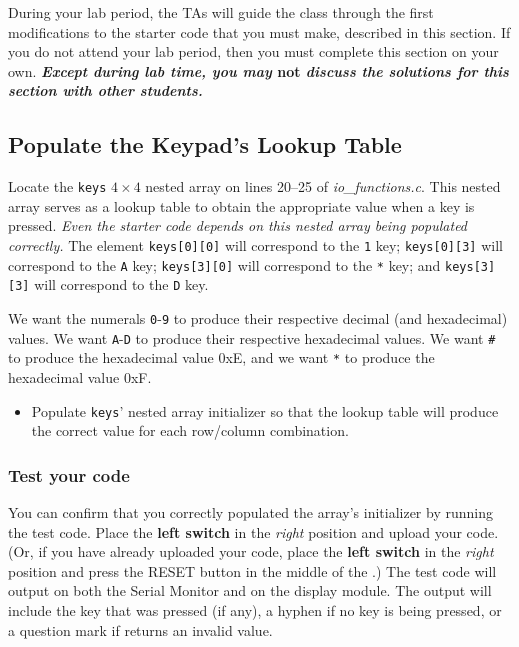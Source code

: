 During your lab period, the TAs will guide the class through the first modifications to the starter code that you must make, described in this section.
If you do not attend your lab period, then you must complete this section on your own.
\textbf{\textit{Except during lab time, you may }not\textit{ discuss the solutions for this section with other students.}}




\subsection{Populate the Keypad's Lookup Table} \label{subsec:populatekeypad}

Locate the \lstinline{keys} $4 \times 4$ nested array on lines 20--25 of \textit{io\_functions.c}.
This nested array serves as a lookup table to obtain the appropriate value when a key is pressed.
\textit{Even the starter code depends on this nested array being populated correctly.}
The element \lstinline{keys[0][0]} will correspond to the \texttt{1} key;
\lstinline{keys[0][3]} will correspond to the \texttt{A} key;
\lstinline{keys[3][0]} will correspond to the \texttt{*} key;
and \lstinline{keys[3][3]} will correspond to the \texttt{D} key.

We want the numerals \texttt{0}-\texttt{9} to produce their respective decimal (and hexadecimal) values.
We want \texttt{A}-\texttt{D} to produce their respective hexadecimal values.
We want \texttt{\#} to produce the hexadecimal value 0xE, and we want \texttt{*} to produce the hexadecimal value 0xF\@.

\begin{itemize}
    \item Populate \lstinline{keys}' nested array initializer so that the lookup table will produce the correct value for each row/column combination.
\end{itemize}

\subsubsection*{Test your code}

You can confirm that you correctly populated the array's initializer by running the test code.
Place the \textbf{left switch} in the \textit{right} position and upload your code.
(Or, if you have already uploaded your code, place the \textbf{left switch} in the \textit{right} position and press the RESET button in the middle of the \developmentboard.)
The test code will output on both the Serial Monitor and on the display module.
The output will include the key that was pressed (if any), a hyphen if no key is being pressed, or a question mark if  returns an invalid value.

